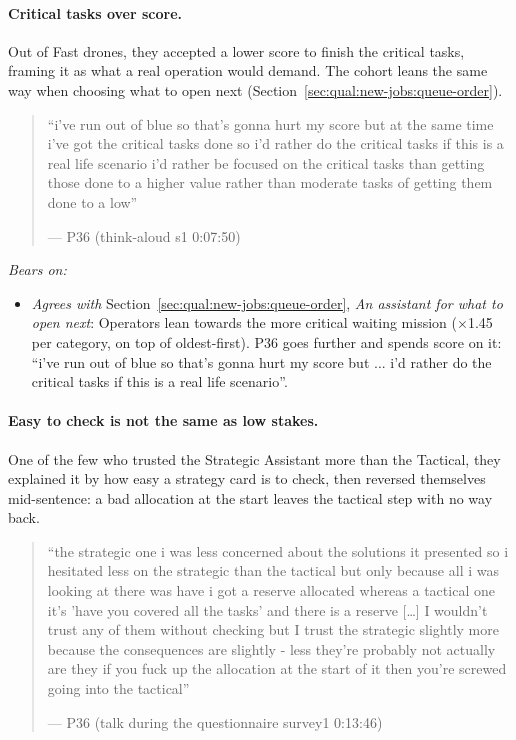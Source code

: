 
\label{sec:qual:practitioner:pt-critical-first}\paragraph{Critical tasks over score.}
Out of Fast drones, they accepted a lower score to finish the critical tasks, framing it as what a real operation would demand. The cohort leans the same way when choosing what to open next (Section~\ref{sec:qual:new-jobs:queue-order}).

\begin{quote}\small
``i've run out of blue so that's gonna hurt my score but at the same time i've got the critical tasks done so i'd rather do the critical tasks if this is a real life scenario i'd rather be focused on the critical tasks than getting those done to a higher value rather than moderate tasks of getting them done to a low''\par\hfill--- P36 (think-aloud s1 0:07:50)
\end{quote}

\noindent\textit{Bears on:}
\begin{itemize}[leftmargin=1.2em,itemsep=1pt]\small
\item \textit{Agrees with} Section~\ref{sec:qual:new-jobs:queue-order}, \emph{An assistant for what to open next}: Operators lean towards the more critical waiting mission ($\times$1.45 per category, on top of oldest-first). P36 goes further and spends score on it: ``i've run out of blue so that's gonna hurt my score but ... i'd rather do the critical tasks if this is a real life scenario''.
\end{itemize}


\label{sec:qual:practitioner:pt-strategic-trust}\paragraph{Easy to check is not the same as low stakes.}
One of the few who trusted the Strategic Assistant more than the Tactical, they explained it by how easy a strategy card is to check, then reversed themselves mid-sentence: a bad allocation at the start leaves the tactical step with no way back.

\begin{quote}\small
``the strategic one i was less concerned about the solutions it presented so i hesitated less on the strategic than the tactical but only because all i was looking at there was have i got a reserve allocated whereas a tactical one it's 'have you covered all the tasks' and there is a reserve [\ldots{}] I wouldn't trust any of them without checking but I trust the strategic slightly more because the consequences are slightly - less they're probably not actually are they if you fuck up the allocation at the start of it then you're screwed going into the tactical''\par\hfill--- P36 (talk during the questionnaire survey1 0:13:46)
\end{quote}

